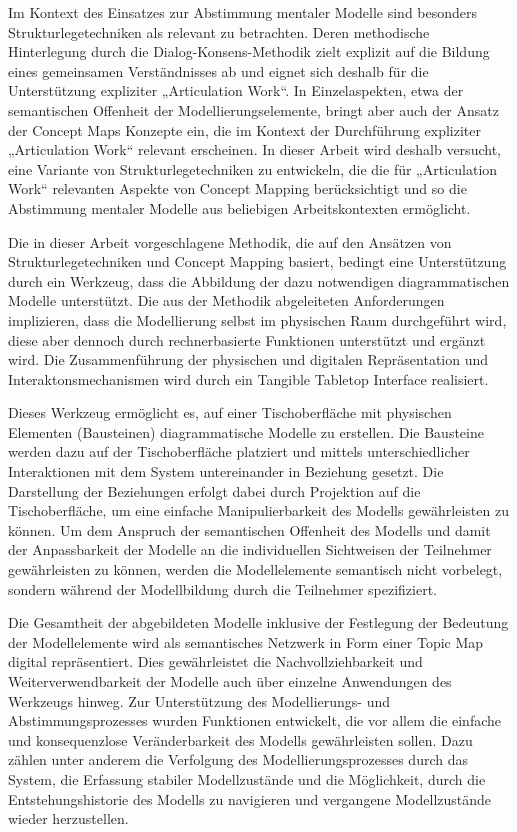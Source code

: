 Im Kontext des Einsatzes zur Abstimmung mentaler Modelle sind besonders Strukturlegetechniken als relevant zu betrachten. Deren methodische Hinterlegung durch die Dialog-Konsens-Methodik zielt explizit auf die Bildung eines gemeinsamen Verständnisses ab und eignet sich deshalb für die Unterstützung expliziter „Articulation Work“. In Einzelaspekten, etwa der semantischen Offenheit der Modellierungselemente, bringt aber auch der Ansatz der Concept Maps Konzepte ein, die im Kontext der Durchführung expliziter „Articulation Work“ relevant erscheinen. In dieser Arbeit wird deshalb versucht, eine Variante von Strukturlegetechniken zu entwickeln, die die für „Articulation Work“ relevanten Aspekte von Concept Mapping berücksichtigt und so die Abstimmung mentaler Modelle aus beliebigen Arbeitskontexten ermöglicht. 

Die in dieser Arbeit vorgeschlagene Methodik, die auf den Ansätzen von Strukturlegetechniken und Concept Mapping basiert, bedingt eine Unterstützung durch ein Werkzeug, dass die Abbildung der dazu notwendigen diagrammatischen Modelle unterstützt. Die aus der Methodik abgeleiteten Anforderungen implizieren, dass die Modellierung selbst im physischen Raum durchgeführt wird, diese aber dennoch durch rechnerbasierte Funktionen unterstützt und ergänzt wird. Die Zusammenführung der physischen und digitalen Repräsentation und Interaktonsmechanismen wird durch ein Tangible Tabletop Interface realisiert.

Dieses Werkzeug ermöglicht es, auf einer Tischoberfläche mit physischen Elementen (Bausteinen) diagrammatische Modelle zu erstellen. Die Bausteine werden dazu auf der Tischoberfläche platziert und mittels unterschiedlicher Interaktionen mit dem System untereinander in Beziehung gesetzt. Die Darstellung der Beziehungen erfolgt dabei durch Projektion auf die Tischoberfläche, um eine einfache Manipulierbarkeit des Modells gewährleisten zu können. Um dem Anspruch der semantischen Offenheit des Modells und damit der Anpassbarkeit der Modelle an die individuellen Sichtweisen der Teilnehmer gewährleisten zu können, werden die Modellelemente semantisch nicht vorbelegt, sondern während der Modellbildung durch die Teilnehmer spezifiziert. 

Die Gesamtheit der abgebildeten Modelle inklusive der Festlegung der Bedeutung der Modellelemente wird als semantisches Netzwerk in Form einer Topic Map digital repräsentiert. Dies gewährleistet die Nachvollziehbarkeit und Weiterverwendbarkeit der Modelle auch über einzelne Anwendungen des Werkzeugs hinweg. Zur Unterstützung des Modellierungs- und Abstimmungsprozesses wurden Funktionen entwickelt, die vor allem die einfache und konsequenzlose Veränderbarkeit des Modells gewährleisten sollen. Dazu zählen unter anderem die Verfolgung des Modellierungsprozesses durch das System, die Erfassung stabiler Modellzustände und die Möglichkeit, durch die Entstehungshistorie des Modells zu navigieren und vergangene Modellzustände wieder herzustellen.  

